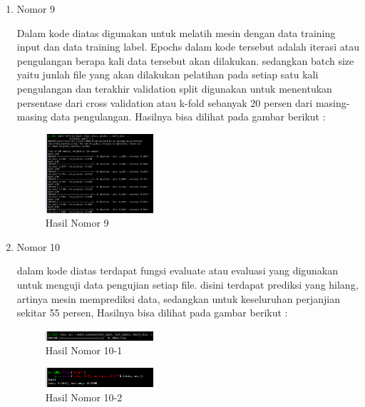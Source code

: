 \begin{enumerate}
\item Nomor 9
\hfill\break
	
Dalam kode diatas digunakan untuk melatih mesin dengan data training input dan data training label. Epochs dalam kode tersebut adalah iterasi atau pengulangan berapa kali data tersebut akan dilakukan. sedangkan batch size yaitu junlah file yang akan dilakukan pelatihan pada setiap satu kali pengulangan dan terakhir validation split digunakan untuk menentukan persentase dari cross validation atau k-fold sebanyak 20 persen dari masing-masing data pengulangan. Hasilnya bisa dilihat pada gambar berikut :
\hfill\break
	\begin{figure}[H]
		\includegraphics[width=4cm]{figures/1174054/6/37.png}
		\centering
		\caption{Hasil Nomor 9}
	\end{figure}
	
\item Nomor 10
\hfill\break
	
dalam kode diatas terdapat fungsi evaluate atau evaluasi yang digunakan untuk menguji data pengujian setiap file. disini terdapat prediksi yang hilang, artinya mesin memprediksi data, sedangkan untuk keseluruhan perjanjian sekitar 55 persen, Hasilnya bisa dilihat pada gambar berikut :
\hfill\break
	\begin{figure}[H]
		\includegraphics[width=4cm]{figures/1174054/6/38.png}
		\centering
		\caption{Hasil Nomor 10-1}
	\end{figure}
	\begin{figure}[H]
		\includegraphics[width=4cm]{figures/1174054/6/39.png}
		\centering
		\caption{Hasil Nomor 10-2}
	\end{figure}
	

\end{enumerate}

